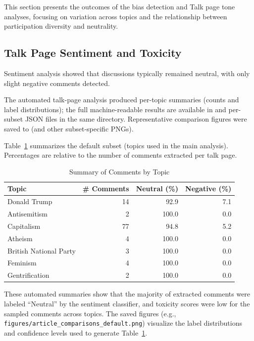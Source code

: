 
\label{sec:results}

This section presents the outcomes of the bias detection and Talk page tone analyses, focusing on variation across topics and the relationship between participation diversity and neutrality.

\subsection{Talk Page Sentiment and Toxicity}
Sentiment analysis showed that discussions typically remained neutral, with only slight negative comments detected.

The automated talk-page analysis produced per-topic summaries (counts and label distributions); the full machine-readable results are available in  and per-subset JSON files in the same directory. Representative comparison figures were saved to  (and other subset-specific PNGs).

Table~\ref{tab:talk-summary} summarizes the default subset (topics used in the main analysis). Percentages are relative to the number of comments extracted per talk page.
\begin{table}[h]
\centering
\begin{tabular}{lrrr}
\hline
Topic & \# Comments & Neutral (\%) & Negative (\%) \\
\hline
Donald Trump         & 14 & 92.9  & 7.1 \\
Antisemitism         & 2  & 100.0 & 0.0 \\
Capitalism           & 77 & 94.8  & 5.2 \\
Atheism              & 4  & 100.0 & 0.0 \\
British National Party & 3 & 100.0 & 0.0 \\
Feminism             & 4  & 100.0 & 0.0 \\
Gentrification       & 2  & 100.0 & 0.0 \\
\hline
\end{tabular}
\caption{Summary of Comments by Topic}
\label{tab:talk-summary}
\end{table}


These automated summaries show that the majority of extracted comments were labeled ``Neutral'' by the sentiment classifier, and toxicity scores were low for the sampled comments across topics. The saved figures (e.g., \texttt{figures/article\_comparisons\_default.png}) visualize the label distributions and confidence levels used to generate Table~\ref{tab:talk-summary}.

